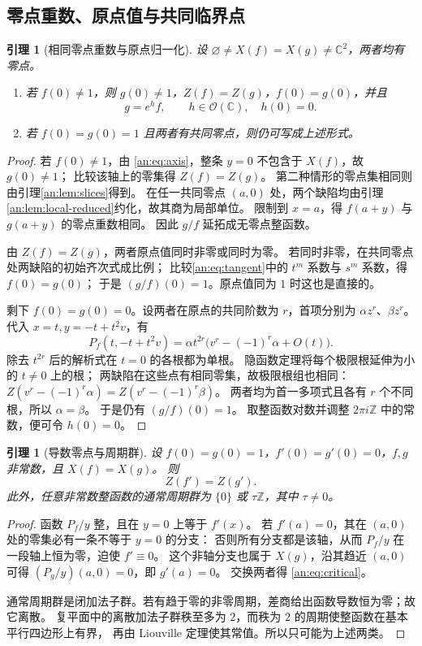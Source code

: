 \documentclass[11pt,a4paper,oneside,openany]{book}
\theoremstyle{lecture}
\newtheorem{lemma}[theorem]{引理}
\newcommand{\C}{\mathbb C}
\newcommand{\Z}{\mathbb Z}
\newcommand{\OO}{\mathcal O}
\numberwithin{equation}{section}
\begin{document}
\subsection{零点重数、原点值与共同临界点}
\begin{lemma}[相同零点重数与原点归一化]\label{an:lem:quotient}
设 $\varnothing\ne X(f)=X(g)\ne\C^2$，两者均有零点。
\begin{enumerate}[label=(\roman*)]
\item 若 $f(0)\ne1$，则 $g(0)\ne1$，$Z(f)=Z(g)$，$f(0)=g(0)$，并且
\[
 g=e^hf,\qquad h\in\OO(\C),\quad h(0)=0.
\]
\item 若 $f(0)=g(0)=1$ 且两者有共同零点，则仍可写成上述形式。
\end{enumerate}
\end{lemma}
\begin{proof}
若 $f(0)\ne1$，由 \eqref{an:eq:axis}，整条 $y=0$ 不包含于 $X(f)$，故 $g(0)\ne1$；
比较该轴上的零集得 $Z(f)=Z(g)$。
第二种情形的零点集相同则由引理\ref{an:lem:slices}得到。
在任一共同零点 $(a,0)$ 处，两个缺陷均由引理\ref{an:lem:local-reduced}约化，故其商为局部单位。
限制到 $x=a$，得 $f(a+y)$ 与 $g(a+y)$ 的零点重数相同。
因此 $g/f$ 延拓成无零点整函数。

由 $Z(f)=Z(g)$，两者原点值同时非零或同时为零。
若同时非零，在共同零点处两缺陷的初始齐次式成比例；
比较\eqref{an:eq:tangent}中的 $t^m$ 系数与 $s^m$ 系数，得 $f(0)=g(0)$；
于是 $(g/f)(0)=1$。原点值同为 $1$ 时这也是直接的。

剩下 $f(0)=g(0)=0$。设两者在原点的共同阶数为 $r$，首项分别为 $\alpha z^r$、$\beta z^r$。
代入 $x=t,y=-t+t^2v$，有
\[
 P_f(t,-t+t^2v)
 =\alpha t^{2r}\bigl(v^r-(-1)^r\alpha+O(t)\bigr).
\]
除去 $t^{2r}$ 后的解析式在 $t=0$ 的各根都为单根。
隐函数定理将每个极限根延伸为小的 $t\ne0$ 上的根；
两缺陷在这些点有相同零集，故极限根组也相同：
$Z(v^r-(-1)^r\alpha)=Z(v^r-(-1)^r\beta)$。
两者均为首一多项式且各有 $r$ 个不同根，所以 $\alpha=\beta$。
于是仍有 $(g/f)(0)=1$。
取整函数对数并调整 $2\pi i\Z$ 中的常数，便可令 $h(0)=0$。
\end{proof}

\begin{lemma}[导数零点与周期群]\label{an:lem:critical-period}
设 $f(0)=g(0)=1$，$f'(0)=g'(0)=0$，$f,g$ 非常数，且 $X(f)=X(g)$。
则
\begin{equation}\label{an:eq:critical}
 Z(f')=Z(g').
\end{equation}
此外，任意非常数整函数的通常周期群为 $\{0\}$ 或 $\tau\Z$，其中 $\tau\ne0$。
\end{lemma}
\begin{proof}
函数 $P_f/y$ 整，且在 $y=0$ 上等于 $f'(x)$。
若 $f'(a)=0$，其在 $(a,0)$ 处的零集必有一条不等于 $y=0$ 的分支：
否则所有分支都是该轴，从而 $P_f/y$ 在一段轴上恒为零，迫使 $f'\equiv0$。
这个非轴分支也属于 $X(g)$，沿其趋近 $(a,0)$ 可得 $(P_g/y)(a,0)=0$，即 $g'(a)=0$。
交换两者得 \eqref{an:eq:critical}。

通常周期群是闭加法子群。若有趋于零的非零周期，差商给出函数导数恒为零；故它离散。
复平面中的离散加法子群秩至多为 $2$，而秩为 $2$ 的周期使整函数在基本平行四边形上有界，
再由 Liouville 定理使其常值。所以只可能为上述两类。
\end{proof}
\end{document}
